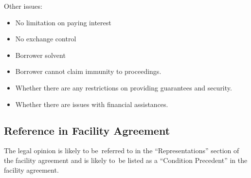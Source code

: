 \documentclass[
]{article}
\newenvironment{Shaded}{}{}
\newcommand{\NormalTok}[1]{#1}
\providecommand{\tightlist}{%
  \setlength{\itemsep}{0pt}\setlength{\parskip}{0pt}}
\begin{document}
Other issues:

\begin{itemize}
\tightlist
\item
  No limitation on paying interest
\item
  No exchange control
\item
  Borrower solvent
\item
  Borrower cannot claim immunity to proceedings.
\item
  Whether there are any restrictions on providing guarantees and
  security.
\item
  Whether there are issues with financial assistances.
\end{itemize}

\hypertarget{reference-in-facility-agreement}{%
\subsection{Reference in Facility
Agreement}\label{reference-in-facility-agreement}}

\begin{Shaded}
\begin{Highlighting}[]
\NormalTok{The legal opinion is likely to be referred to in the “Representations” section of the facility agreement and is likely to be listed as a “Condition Precedent” in the facility agreement.}
\end{Highlighting}
\end{Shaded}
\end{document}
